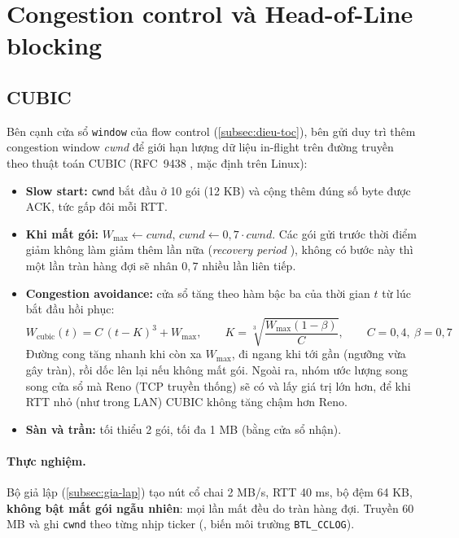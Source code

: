 \section{Congestion control và Head-of-Line blocking}
\label{sec:cc-hol}

\subsection{CUBIC}
\label{subsec:cubic}
Bên cạnh cửa sổ \texttt{window} của flow control (\cref{subsec:dieu-toc}), bên gửi duy trì thêm congestion window
\textit{cwnd} để giới hạn lượng dữ liệu in-flight trên đường truyền theo thuật toán CUBIC (RFC~9438
\cite{rfc9438}, mặc định trên Linux):
\begin{itemize}
  \item \textbf{Slow start:} \texttt{cwnd} bắt đầu ở 10 gói (12 KB) \cite{rfc9002} và cộng thêm đúng số byte được
        ACK, tức gấp đôi mỗi RTT.
  \item \textbf{Khi mất gói:} $W_\text{max} \leftarrow \mathit{cwnd}$, $\mathit{cwnd} \leftarrow 0{,}7 \cdot
        \mathit{cwnd}$. Các gói gửi trước thời điểm giảm không làm giảm thêm lần nữa (\emph{recovery period}
        \cite{rfc9002}), không có bước này thì một lần tràn hàng đợi sẽ nhân $0{,}7$ nhiều lần liên tiếp.
  \item \textbf{Congestion avoidance:} cửa sổ tăng theo hàm bậc ba của thời gian $t$ từ lúc bắt đầu hồi phục:
        \begin{equation}
          W_\text{cubic}(t) = C\,(t-K)^3 + W_\text{max}, \qquad
          K = \sqrt[3]{\frac{W_\text{max}(1-\beta)}{C}}, \qquad C = 0{,}4,\ \beta = 0{,}7
          \label{eq:cubic}
        \end{equation}
        Đường cong tăng nhanh khi còn xa $W_\text{max}$, đi ngang khi tới gần (ngưỡng vừa gây tràn), rồi dốc lên
        lại nếu không mất gói. Ngoài ra, nhóm ước lượng song song cửa sổ mà Reno (TCP truyền thống) sẽ có và lấy
        giá trị lớn hơn, để khi RTT nhỏ (như trong LAN) CUBIC không tăng chậm hơn Reno.
  \item \textbf{Sàn và trần:} tối thiểu 2 gói, tối đa 1 MB (bằng cửa sổ nhận).
\end{itemize}

\paragraph{Thực nghiệm.} Bộ giả lập (\cref{subsec:gia-lap}) tạo nút cổ chai 2 MB/s, RTT 40 ms, bộ đệm 64 KB,
\textbf{không bật mất gói ngẫu nhiên}: mọi lần mất đều do tràn hàng đợi. Truyền 60 MB và ghi \texttt{cwnd} theo
từng nhịp ticker (, biến môi trường \texttt{BTL\_CCLOG}).

